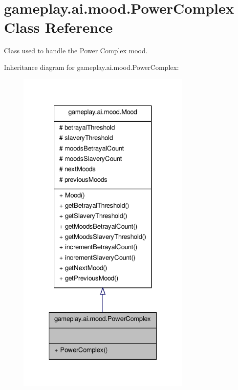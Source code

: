 \hypertarget{classgameplay_1_1ai_1_1mood_1_1_power_complex}{\section{gameplay.\-ai.\-mood.\-Power\-Complex Class Reference}
\label{classgameplay_1_1ai_1_1mood_1_1_power_complex}
}


Class used to handle the Power Complex mood.  




Inheritance diagram for gameplay.\-ai.\-mood.\-Power\-Complex\-:
\nopagebreak
\begin{figure}[H]
\begin{center}
\leavevmode
\includegraphics[width=244pt]{classgameplay_1_1ai_1_1mood_1_1_power_complex__inherit__graph}
\end{center}
\end{figure}


